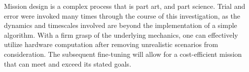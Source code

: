 \documentclass[]{aiaa-tc}%
\begin{document}
	\vspace{5 mm}

Mission design is a complex process that is part art, and part science. Trial and error were invoked many times through the course of this investigation, as the dynamics and timescales involved are beyond the implementation of a simple algorithm. With a firm grasp of the underlying mechanics, one can effectively utilize hardware computation after removing unrealistic scenarios from consideration. The subsequent fine-tuning will allow for a cost-efficient mission that can meet and exceed its stated goals.



%    
    
%    
%    
%    
%
%
%
%
	
\end{document}
